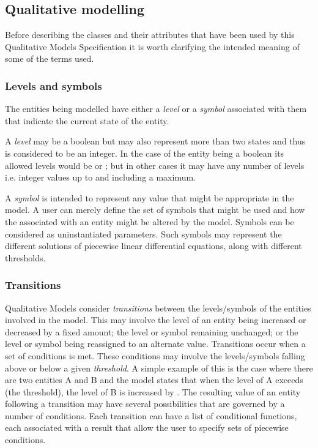 \subsection{Qualitative modelling}
\label{qual}

Before describing the classes and their attributes that have been used by this Qualitative Models Specification it is worth clarifying the intended meaning of some of the terms used. 

\subsubsection{Levels and symbols}

The entities being modelled have either a \emph{level} or a \emph{symbol} associated with them that indicate the current state of the entity. 

A \emph{level} may be a boolean but may also represent more than two states and thus is considered to be an integer. In the case of the entity being a boolean its allowed levels would be  or ; but in other cases it may have any number of levels i.e. integer values up to and including a maximum. 

A \emph{symbol} is intended to represent any value that might be appropriate in the model.  A user can merely define the set of symbols that might be used and how the  associated with an entity might be altered  by the model. Symbols can be considered as uninstantiated parameters. Such symbols may represent the different solutions of piecewise linear differential equations, along with different thresholds.

\subsubsection{Transitions}

Qualitative Models consider \emph{transitions} between the levels/symbols of the entities involved in the model. This may involve the level of an entity being increased or decreased by a fixed amount; the level or symbol remaining unchanged; or the level or symbol being reassigned to an alternate value. Transitions occur when a set of conditions is met. These conditions may involve the levels/symbols falling above or below  a given \emph{threshold}. A simple example of this is the case where there are two entities A and B and the model states that when the level of A exceeds  (the threshold), the level of B is increased by . The resulting value of an entity following a transition may have several possibilities that are governed by a number of conditions. Each transition can have a list of conditional functions, each associated with a result that allow the user to specify sets of piecewise conditions.





